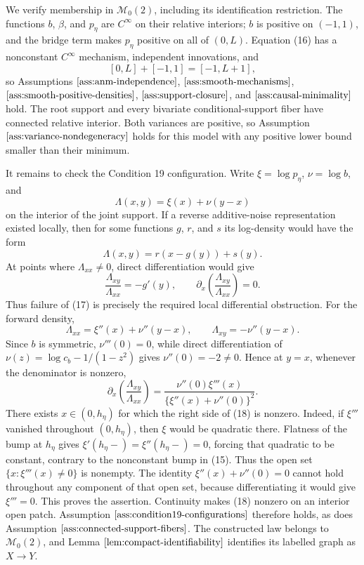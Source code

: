 We verify membership in \(\mathcal M_0(2)\), including its identification restriction.  The functions \(b\), \(\beta\), and \(p_\eta\) are \(C^\infty\) on their relative interiors; \(b\) is positive on \((-1,1)\), and the bridge term makes \(p_\eta\) positive on all of \((0,L)\).  Equation (16) has a nonconstant \(C^\infty\) mechanism, independent innovations, and
\[
 [0,L]+[-1,1]=[-1,L+1],
\]
so Assumptions \(\ref{ass:anm-independence}\), \(\ref{ass:smooth-mechanisms}\), \(\ref{ass:smooth-positive-densities}\), \(\ref{ass:support-closure}\), and \(\ref{ass:causal-minimality}\) hold.  The root support and every bivariate conditional-support fiber have connected relative interior.  Both variances are positive, so Assumption \(\ref{ass:variance-nondegeneracy}\) holds for this model with any positive lower bound smaller than their minimum.

It remains to check the Condition 19 configuration.  Write \(\xi=\log p_\eta\), \(\nu=\log b\), and
\[
 \Lambda(x,y)=\xi(x)+\nu(y-x)
\]
on the interior of the joint support.  If a reverse additive-noise representation existed locally, then for some functions \(g\), \(r\), and \(s\) its log-density would have the form
\[
 \Lambda(x,y)=r(x-g(y))+s(y).
\]
At points where \(\Lambda_{xx}\ne0\), direct differentiation would give
\[
 \frac{\Lambda_{xy}}{\Lambda_{xx}}=-g'(y),
 \qquad
 \partial_x\left(\frac{\Lambda_{xy}}{\Lambda_{xx}}\right)=0. \tag{17}
\]
Thus failure of (17) is precisely the required local differential obstruction.  For the forward density,
\[
 \Lambda_{xx}=\xi''(x)+\nu''(y-x),
 \qquad \Lambda_{xy}=-\nu''(y-x).
\]
Since \(b\) is symmetric, \(\nu'''(0)=0\), while direct differentiation of \(\nu(z)=\log c_b-1/(1-z^2)\) gives \(\nu''(0)=-2\ne0\).  Hence at \(y=x\), whenever the denominator is nonzero,
\[
 \partial_x\left(\frac{\Lambda_{xy}}{\Lambda_{xx}}\right)
 =\frac{\nu''(0)\xi'''(x)}{\{\xi''(x)+\nu''(0)\}^2}. \tag{18}
\]
There exists \(x\in(0,h_\eta)\) for which the right side of (18) is nonzero.  Indeed, if \(\xi'''\) vanished throughout \((0,h_\eta)\), then \(\xi\) would be quadratic there.  Flatness of the bump at \(h_\eta\) gives \(\xi'(h_\eta-)=\xi''(h_\eta-)=0\), forcing that quadratic to be constant, contrary to the nonconstant bump in (15).  Thus the open set \(\{x:\xi'''(x)\ne0\}\) is nonempty.  The identity \(\xi''(x)+\nu''(0)=0\) cannot hold throughout any component of that open set, because differentiating it would give \(\xi'''=0\).  This proves the assertion.  Continuity makes (18) nonzero on an interior open patch.  Assumption \(\ref{ass:condition19-configurations}\) therefore holds, as does Assumption \(\ref{ass:connected-support-fibers}\).  The constructed law belongs to \(\mathcal M_0(2)\), and Lemma \(\ref{lem:compact-identifiability}\) identifies its labelled graph as \(X\to Y\).

